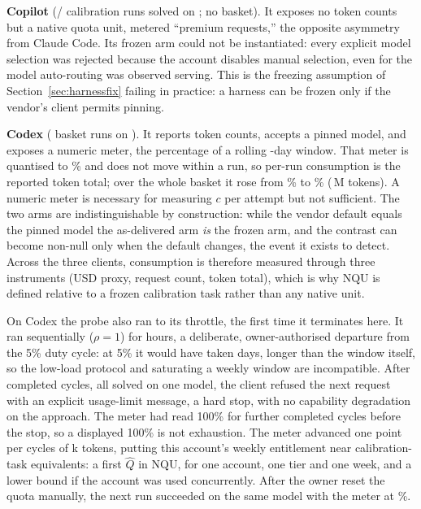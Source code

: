\documentclass[conference]{IEEEtran}
\theoremstyle{plain}
\theoremstyle{definition}
\newcommand{\NQU}{\ensuremath{\mathrm{NQU}}}
\begin{document}
\textbf{Copilot} (\copilotVerifyOraclePass/\copilotVerifyCalls{} calibration
runs solved on \copilotVerifyDate; no basket). It exposes no token counts but
a native quota unit, metered ``premium requests,'' the opposite asymmetry from
Claude Code. Its frozen arm could not be instantiated: every explicit model
selection was rejected because the account disables manual selection, even
for the model auto-routing was observed serving. This is the freezing
assumption of Section~\ref{sec:harnessfix} failing in practice: a harness can
be frozen only if the vendor's client permits pinning.

\textbf{Codex} (\codexNRuns{} basket runs on \codexModel). It reports token
counts, accepts a pinned model, and exposes a numeric meter, the percentage of
a rolling \codexMeterWindowDays-day window. That meter is quantised to
\codexMeterRes\% and does not move within a run, so per-run consumption is the
reported token total; over the whole basket it rose from \codexMeterStart\% to
\codexMeterEnd\% (\codexTokMillions\,M tokens). A numeric meter is necessary for
measuring $c$ per attempt but not sufficient. The two arms are
indistinguishable by construction: while the vendor default equals the pinned
model the as-delivered arm \emph{is} the frozen arm, and the contrast can
become non-null only when the default changes, the event it exists to detect.
Across the three clients, consumption is therefore measured through three
instruments (USD proxy, request count, token total), which is why \NQU{} is
defined relative to a frozen calibration task rather than any native unit.

On Codex the probe also ran to its throttle, the first time it terminates
here. It ran sequentially ($\rho=1$) for \codexProbeHours{} hours, a deliberate,
owner-authorised departure from the 5\% duty cycle: at 5\% it would have taken
\codexProbeDutyDays{} days, longer than the window itself, so the low-load
protocol and saturating a weekly window are incompatible. After
\codexProbeCycles{} completed cycles, all solved on one model, the client
refused the next request with an explicit usage-limit message, a hard stop, with
no capability degradation on the approach. The meter had read 100\% for
\codexProbeAtFull{} further completed cycles before the stop, so a displayed
100\% is not exhaustion. The meter advanced one point per
\codexProbePerPoint{} cycles of \codexProbeTokK{}k tokens, putting this
account's weekly entitlement near \codexProbeQ{} calibration-task equivalents:
a first $\hat Q$ in \NQU, for one account, one tier and one week, and a lower
bound if the account was used concurrently. After the owner reset the quota
manually, the next run succeeded on the same model with the meter at
\codexPostResetMeter\%.
\end{document}

